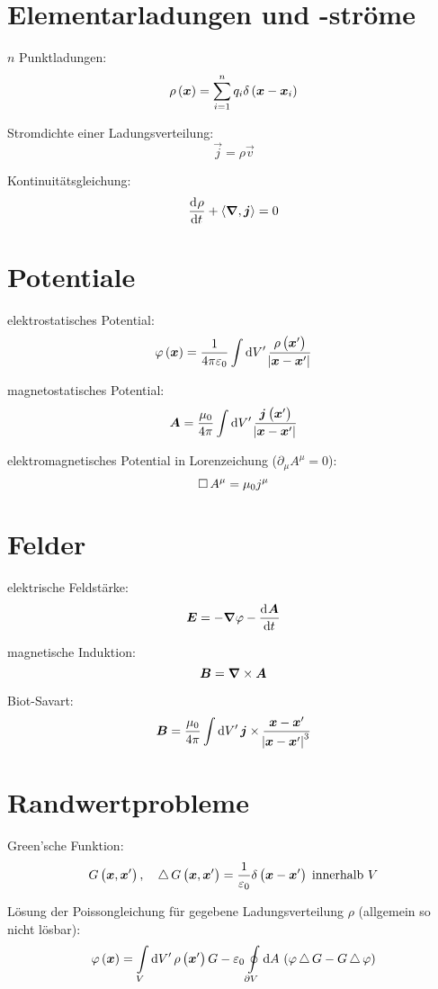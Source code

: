 \section{Elementarladungen und -ströme}

$n$ Punktladungen:
\[
	\rho\del{\vec x} = \sum_{i = 1}^n q_i \delta\del{\vec x - \vec x_i}
\]

Stromdichte einer Ladungsverteilung:
\[
	\vec j = \rho \vec v
\]

Kontinuitätsgleichung:
\[
	\dod \rho t + \divergence{\vec j} = 0
\]

\section{Potentiale}

elektrostatisches Potential:
\[
	\varphi\del{\vec x}
	= \frac{1}{4 \pi \varepsilon_0} \int \dif{V'} \,
	\frac{\rho\del{\vec x'}}{\abs{\vec x - \vec x'}}
\]

magnetostatisches Potential:
\[
	\vec A
	= \frac{\mu_0}{4 \pi} \int \dif{V'} \,
	\frac{\vec j\del{\vec x'}}{\abs{\vec x - \vec x'}}
\]

elektromagnetisches Potential in Lorenzeichung ($\partial_\mu A^\mu = 0$):
\[
	\operatorname{\Box} A^\mu = \mu_0 j^\mu
\]

\section{Felder}

elektrische Feldstärke:
\[
	\vec E = - \vnabla \varphi - \dod{\vec A}t
\]

magnetische Induktion:
\[
	\boldsymbol{B} = \boldsymbol{\nabla} \times \boldsymbol{A}
\]

Biot-Savart:
\[
	\vec B = \frac{\mu_0}{4 \pi} \int \dif{V'} \, \vec j \times \frac{\vec x - \vec x'}{\abs{\vec x - \vec x'}^3}
\]

\section{Randwertprobleme}

Green'sche Funktion:
\[
	G\del{\vec x, \vec x'}
	\eqnsep
	\laplace G\del{\vec x, \vec x'}
	= \frac{1}{\varepsilon_0} \delta\del{\vec x - \vec x'} \; \text{innerhalb $V$}
\]

Lösung der Poissongleichung für gegebene Ladungsverteilung $\rho$ (allgemein so
nicht lösbar):
\[
	\varphi\del{\vec x}
	= \intop_{V} \dif{V'} \, \rho\del{\vec x'} G
	- \varepsilon_0 \ointop_{\partial V} \dif A \,
	\del{\varphi \laplace G - G \laplace \varphi}
\]

